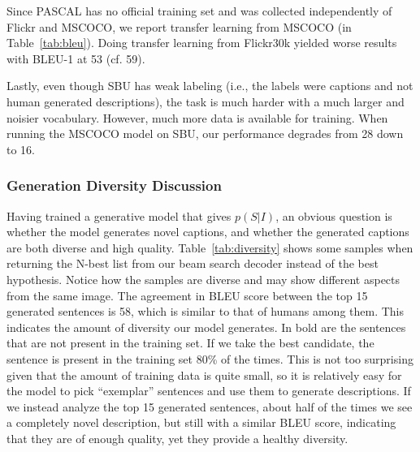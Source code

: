 Since PASCAL has no official training set and was collected independently of Flickr and MSCOCO, we
report transfer learning from MSCOCO (in Table~\ref{tab:bleu}). Doing transfer learning from
Flickr30k yielded worse results with BLEU-1 at 53 (cf. 59).

Lastly, even though SBU has weak labeling (i.e., the labels were captions and not
human generated descriptions), the task is much harder with a much larger and noisier
vocabulary. However, much more data is available for training. When running the MSCOCO
model on SBU, our performance degrades from 28 down to 16.

\subsubsection{Generation Diversity Discussion}

Having trained a generative model that gives $p(S|I)$, an obvious question is
whether the model generates novel captions, and whether the generated captions
are both diverse and high quality.
Table~\ref{tab:diversity} shows some samples when returning the N-best list from our
beam search decoder instead of the best hypothesis. Notice how the samples are
diverse and may show different aspects from the same image.
The agreement in BLEU score between the top 15 generated sentences is 58, which is similar to that of humans among them. This indicates the amount of diversity
our model generates.
In bold are the sentences that
are not present in the training set. If we take the best candidate, the
sentence is present in the training set 80\% of the times.
This is not too surprising given that the amount
of training data is quite small, so it is relatively easy for the model to pick ``exemplar''
sentences and use them to generate descriptions.
If we instead analyze the top 15 generated sentences, about half of the times we
see a completely novel description, but still with a similar BLEU score,
indicating that they are of enough quality, yet they
provide a healthy diversity.

